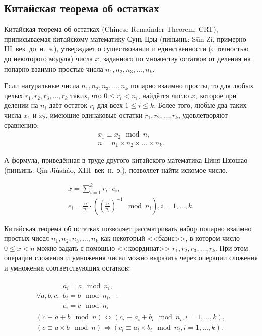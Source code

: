 \subsection{Китайская теорема об остатках}\label{section-chinese-remainder-theorem}

Китайская теорема об остатках (Chinese Remainder Theorem, CRT), приписываемая китайскому математику Сунь Цзы (пиньинь: S\={u}n Z\v{i}, примерно III~век~до~н.~э.), утверждает о существовании и единственности (с точностью до некоторого модуля) числа $x$, заданного по множеству остатков от деления на попарно взаимно простые числа $n_1, n_2, n_3, \dots, n_k$.

\begin{theorem} Если натуральные числа $n_1, n_2, n_3, \dots, n_k$ попарно взаимно просты, то для любых целых $r_1, r_2, r_3, \dots, r_k$ таких, что $0 \leq r_i < n_i$, найдётся число $x$, которое при делении на $n_i$ даёт остаток $r_i$ для всех $1 \leq i \leq k$. Более того, любые два таких числа $x_1$ и $x_2$, имеющие одинаковые остатки $r_1, r_2, \dots, r_k$, удовлетворяют сравнению:
\[ \begin{array}{l}
	x_1 \equiv x_2 \mod n, \\
	n = n_1 \times n_2 \times \dots \times n_k.
\end{array} \]
\end{theorem}

А формула, приведённая в труде другого китайского математика Циня Цзюшао (пиньинь: Q\'{i}n Ji\v{u}sh\'{a}o, XIII~век~н.~э.), позволяет найти искомое число.

\[ \begin{array}{l}
	x = \sum\limits_{i=1}^k r_i \cdot e_i, \\
	e_i = \frac{n}{n_i} \cdot \left( \left(\frac{n}{n_i}\right)^{-1} \mod n_i \right), i = 1, \dots, k.
\end{array} \]

Китайская теорема об остатках позволяет рассматривать набор попарно взаимно простых чисел $n_1, n_2, n_3, \dots, n_k$ как некоторый <<базис>>, в котором число $0 \leq x < n$ можно задать с помощью <<координат>> $r_1, r_2, r_3, \dots, r_k$. При этом операции сложения и умножения чисел можно выразить через операции сложения и умножения соответствующих остатков:

\[ \begin{array}{l}
	\forall a, b, c, \begin{array}{l}
		a_i = a \mod n_i, \\
		b_i = b \mod n_i, \\
		c_i = c \mod n_i
	\end{array}: \\
	\left( c \equiv a + b \mod n \right) \Leftrightarrow \left( c_i \equiv a_i + b_i \mod n_i, i = 1, \dots, k \right), \\
	\left( c \equiv a \times b \mod n \right) \Leftrightarrow \left( c_i \equiv a_i \times b_i \mod n_i, i = 1, \dots, k \right).
\end{array} \]

